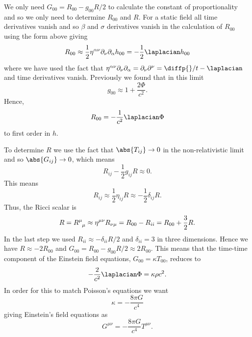 \documentclass[fleqn]{NotesClass}
\begin{document}
    We only need \(G_{00} = R_{00} - g_{00} R/2\) to calculate the constant of proportionality and so we only need to determine \(R_{00}\) and \(R\).
    For a static field all time derivatives vanish and so \(\beta\) and \(\sigma\) derivatives vanish in the calculation of \(R_{00}\) using the form above giving
    \begin{equation}
        R_{00} \approx \frac{1}{2}\eta^{\alpha\nu} \partial_\nu\partial_\alpha h_{00} = -\frac{1}{2}\laplacian h_{00}
    \end{equation}
    where we have used the fact that \(\eta^{\alpha\nu}\partial_\nu\partial_\alpha = \partial_\nu\partial^\nu = \diffp{}/{t} - \laplacian\) and time derivatives vanish.
    Previously we found that in this limit
    \begin{equation}
        g_{00} \approx 1 + \frac{2\Phi}{c^2}.
    \end{equation}
    Hence,
    \begin{equation}
        R_{00} = -\frac{1}{c^2} \laplacian \Phi
    \end{equation}
    to first order in \(h\).
    
    To determine \(R\) we use the fact that \(\abs{T_{ij}} \to 0\) in the non-relativistic limit and so \(\abs{G_{ij}} \to 0\), which means
    \begin{equation}
        R_{ij} - \frac{1}{2}g_{ij}R \approx 0.
    \end{equation}
    This means
    \begin{equation}
        R_{ij} \approx \frac{1}{2}\eta_{ij}R \approx -\frac{1}{2}\delta_{ij}R.
    \end{equation}
    Thus, the Ricci scalar is
    \begin{equation}
        R = \tensor{R}{^\mu_\mu} \approx \eta^{\mu\nu}R_{\nu\mu} = R_{00} - R_{ii} = R_{00} + \frac{3}{2}R.
    \end{equation}
    In the last step we used \(R_{ii} \approx -\delta_{ii}R/2\) and \(\delta_{ii} = 3\) in three dimensions.
    Hence we have \(R \approx -2R_{00}\) and \(G_{00} = R_{00} - g_{00}R/2 \approx 2R_{00}\).
    This means that the time-time component of the Einstein field equations, \(G_{00} = \kappa T_{00}\), reduces to
    \begin{equation}
        -\frac{2}{c^2}\laplacian \Phi = \kappa \rho c^2.
    \end{equation}
    In order for this to match Poisson's equations we want
    \begin{equation}
        \kappa = -\frac{8\pi G}{c^4}
    \end{equation}
    giving Einstein's field equations as
    \begin{equation}
        G^{\mu\nu} = -\frac{8\pi G}{c^4} T^{\mu\nu}.
    \end{equation}
    
\end{document}
